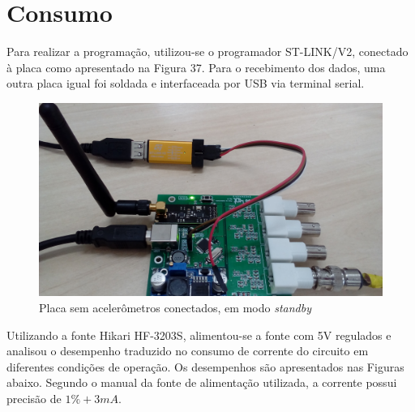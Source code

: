 \documentclass[11pt]{abntex2}
\begin{document}
					\newpage

			\section{Consumo}
				Para realizar a programação, utilizou-se o programador
				ST-LINK/V2, conectado à placa como apresentado na Figura 37. Para
				o recebimento dos dados, uma outra placa igual foi soldada e
				interfaceada por USB via terminal serial.

				\begin{figure}[!ht]
					\centering
					\includegraphics[width=\linewidth]{../Fotos/stlink.jpg}
					\caption{Placa sem acelerômetros conectados, em modo \textit{standby}}
				\end{figure}

				Utilizando a fonte Hikari HF-3203S, alimentou-se a fonte com 5V
				regulados e analisou o desempenho traduzido no consumo de
				corrente do circuito em diferentes condições de operação. Os
				desempenhos são apresentados nas Figuras abaixo. Segundo o
				manual da fonte de alimentação utilizada, a corrente possui
				precisão de $1\% + 3mA$.
				
\end{document}
